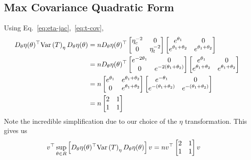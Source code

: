 \documentclass[10pt, a4paper]{article}
\begin{document}
\subsection{Max Covariance Quadratic Form}\label{ssec:max-cov-quad-form}

Using Eq.~\ref{eq:eta-jac},~\ref{eq:t-cov},
\begin{align*}
    D_\theta \eta(\theta)^\top 
    \text{Var}\left(T\right)_\eta 
    D_\theta \eta(\theta)
    &=
    n
    D_\theta \eta(\theta)^\top
    \begin{bmatrix}
        \eta_c^{-2} & 0 \\
        0 & \eta_t^{-2}
    \end{bmatrix}
    \begin{bmatrix}
        e^{\theta_1} & 0 \\
        e^{\theta_1+\theta_2} & e^{\theta_1+\theta_2}
    \end{bmatrix}
    \\&=
    n
    D_\theta \eta(\theta)^\top
    \begin{bmatrix}
        e^{-2\theta_1} & 0 \\
        0 & e^{-2(\theta_1+\theta_2)}
    \end{bmatrix}
    \begin{bmatrix}
        e^{\theta_1} & 0 \\
        e^{\theta_1+\theta_2} & e^{\theta_1+\theta_2}
    \end{bmatrix}
    \\&=
    n
    \begin{bmatrix}
        e^{\theta_1} & e^{\theta_1+\theta_2} \\
        0 & e^{\theta_1+\theta_2}
    \end{bmatrix}
    \begin{bmatrix}
        e^{-\theta_1} & 0 \\
        e^{-(\theta_1+\theta_2)} & e^{-(\theta_1+\theta_2)}
    \end{bmatrix}
    \\&=
    n
    \begin{bmatrix}
        2 & 1 \\
        1 & 1
    \end{bmatrix}
\end{align*}
Note the incredible simplification due to our choice of the $\eta$ transformation.
This gives us
\begin{align*}
    v^\top
    \sup\limits_{\theta \in R} \bracket{%
        D_\theta \eta(\theta)^\top 
        \var{T}_\eta 
        D_\theta \eta(\theta)
    }
    v
    &=
    n v^\top
    \begin{bmatrix}
        2 & 1 \\
        1 & 1
    \end{bmatrix}
    v
\end{align*}
\end{document}
